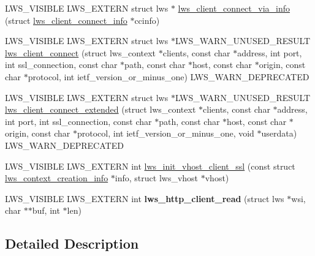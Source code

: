 \begin{DoxyCompactItemize}
\item 
L\+W\+S\+\_\+\+V\+I\+S\+I\+B\+LE L\+W\+S\+\_\+\+E\+X\+T\+E\+RN struct lws $\ast$ \hyperlink{group__client_ga0c966136905f467816307cfba6deb5fd}{lws\+\_\+client\+\_\+connect\+\_\+via\+\_\+info} (struct \hyperlink{structlws__client__connect__info}{lws\+\_\+client\+\_\+connect\+\_\+info} $\ast$ccinfo)
\item 
L\+W\+S\+\_\+\+V\+I\+S\+I\+B\+LE L\+W\+S\+\_\+\+E\+X\+T\+E\+RN struct lws $\ast$L\+W\+S\+\_\+\+W\+A\+R\+N\+\_\+\+U\+N\+U\+S\+E\+D\+\_\+\+R\+E\+S\+U\+LT \hyperlink{group__client_ga4af0a20108a95e8b6d94dd4d80055ff3}{lws\+\_\+client\+\_\+connect} (struct lws\+\_\+context $\ast$clients, const char $\ast$address, int port, int ssl\+\_\+connection, const char $\ast$path, const char $\ast$host, const char $\ast$origin, const char $\ast$protocol, int ietf\+\_\+version\+\_\+or\+\_\+minus\+\_\+one) L\+W\+S\+\_\+\+W\+A\+R\+N\+\_\+\+D\+E\+P\+R\+E\+C\+A\+T\+ED
\item 
L\+W\+S\+\_\+\+V\+I\+S\+I\+B\+LE L\+W\+S\+\_\+\+E\+X\+T\+E\+RN struct lws $\ast$L\+W\+S\+\_\+\+W\+A\+R\+N\+\_\+\+U\+N\+U\+S\+E\+D\+\_\+\+R\+E\+S\+U\+LT \hyperlink{group__client_gac6a8558b4410961a880241c2ac1271e2}{lws\+\_\+client\+\_\+connect\+\_\+extended} (struct lws\+\_\+context $\ast$clients, const char $\ast$address, int port, int ssl\+\_\+connection, const char $\ast$path, const char $\ast$host, const char $\ast$origin, const char $\ast$protocol, int ietf\+\_\+version\+\_\+or\+\_\+minus\+\_\+one, void $\ast$userdata) L\+W\+S\+\_\+\+W\+A\+R\+N\+\_\+\+D\+E\+P\+R\+E\+C\+A\+T\+ED
\item 
L\+W\+S\+\_\+\+V\+I\+S\+I\+B\+LE L\+W\+S\+\_\+\+E\+X\+T\+E\+RN int \hyperlink{group__client_ga4f44b8230e6732816ca5cd8d1aaaf340}{lws\+\_\+init\+\_\+vhost\+\_\+client\+\_\+ssl} (const struct \hyperlink{structlws__context__creation__info}{lws\+\_\+context\+\_\+creation\+\_\+info} $\ast$info, struct lws\+\_\+vhost $\ast$vhost)
\item 
L\+W\+S\+\_\+\+V\+I\+S\+I\+B\+LE L\+W\+S\+\_\+\+E\+X\+T\+E\+RN int {\bfseries lws\+\_\+http\+\_\+client\+\_\+read} (struct lws $\ast$wsi, char $\ast$$\ast$buf, int $\ast$len)\hypertarget{group__client_ga4450c34200bf9dab3beb90ef23221870}{}\label{group__client_ga4450c34200bf9dab3beb90ef23221870}

\end{DoxyCompactItemize}


\subsection{Detailed Description}
